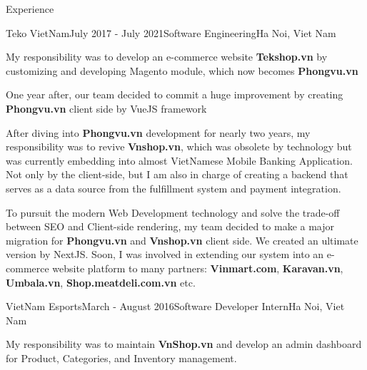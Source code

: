 \documentclass{resume} %
\begin{document}

\begin{rSection}{Experience}

\begin{rSubsection}{Teko VietNam}{July 2017 - July 2021}{Software Engineering}{Ha Noi, Viet Nam}
\item My responsibility was to develop an e-commerce website \textbf{Tekshop.vn} by customizing and developing Magento module, which now becomes \textbf{Phongvu.vn}
\item One year after, our team decided to commit a huge improvement by creating \textbf{Phongvu.vn} client side by VueJS framework
\item After diving into \textbf{Phongvu.vn} development for nearly two years, my responsibility was to revive \textbf{Vnshop.vn}, which was obsolete by technology but was currently embedding into almost VietNamese Mobile Banking Application. Not only by the client-side, but I am also in charge of creating a backend that serves as a data source from the fulfillment system and payment integration.
\item To pursuit the modern Web Development technology and solve the trade-off between SEO and Client-side rendering, my team decided to make a major migration for \textbf{Phongvu.vn} and \textbf{Vnshop.vn} client side. We created an ultimate version by NextJS. Soon, I was involved in extending our system into an e-commerce website platform to many partners: \textbf{Vinmart.com}, \textbf{Karavan.vn}, \textbf{Umbala.vn}, \textbf{Shop.meatdeli.com.vn} etc.
\end{rSubsection}


\begin{rSubsection}{VietNam Esports}{March - August 2016}{Software Developer Intern}{Ha Noi, Viet Nam}
\item My responsibility was to maintain \textbf{VnShop.vn} and develop an admin dashboard for Product, Categories, and Inventory management.
\end{rSubsection}
\end{rSection}

\end{document}
